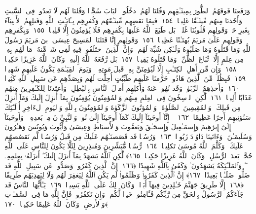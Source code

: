  وَرَفَعنَا فَوقَهُمُ ٱلطُّورَ بِمِيثَـٰقِهِم وَقُلنَا لَهُمُ ٱدخُلُوا۟ ٱلبَابَ سُجَّدًۭا وَقُلنَا لَهُم لَا تَعدُوا۟ فِى ٱلسَّبتِ وَأَخَذنَا مِنهُم مِّيثَـٰقًا غَلِيظًۭا ﴿١٥٤﴾
 فَبِمَا نَقضِهِم مِّيثَـٰقَهُم وَكُفرِهِم بِـَٔايَـٰتِ ٱللَّهِ وَقَتلِهِمُ ٱلأَنۢبِيَآءَ بِغَيرِ حَقٍّۢ وَقَولِهِم قُلُوبُنَا غُلفٌۢ ۚ بَل طَبَعَ ٱللَّهُ عَلَيهَا بِكُفرِهِم فَلَا يُؤمِنُونَ إِلَّا قَلِيلًۭا ﴿١٥٥﴾
 وَبِكُفرِهِم وَقَولِهِم عَلَىٰ مَريَمَ بُهتَـٰنًا عَظِيمًۭا ﴿١٥٦﴾
 وَقَولِهِم إِنَّا قَتَلنَا ٱلمَسِيحَ عِيسَى ٱبنَ مَريَمَ رَسُولَ ٱللَّهِ وَمَا قَتَلُوهُ وَمَا صَلَبُوهُ وَلَـٰكِن شُبِّهَ لَهُم ۚ وَإِنَّ ٱلَّذِينَ ٱختَلَفُوا۟ فِيهِ لَفِى شَكٍّۢ مِّنهُ ۚ مَا لَهُم بِهِۦ مِن عِلمٍ إِلَّا ٱتِّبَاعَ ٱلظَّنِّ ۚ وَمَا قَتَلُوهُ يَقِينًۢا ﴿١٥٧﴾
 بَل رَّفَعَهُ ٱللَّهُ إِلَيهِ ۚ وَكَانَ ٱللَّهُ عَزِيزًا حَكِيمًۭا ﴿١٥٨﴾
 وَإِن مِّن أَهلِ ٱلكِتَـٰبِ إِلَّا لَيُؤمِنَنَّ بِهِۦ قَبلَ مَوتِهِۦ ۖ وَيَومَ ٱلقِيَـٰمَةِ يَكُونُ عَلَيهِم شَهِيدًۭا ﴿١٥٩﴾
 فَبِظُلمٍۢ مِّنَ ٱلَّذِينَ هَادُوا۟ حَرَّمنَا عَلَيهِم طَيِّبَٰتٍ أُحِلَّت لَهُم وَبِصَدِّهِم عَن سَبِيلِ ٱللَّهِ كَثِيرًۭا ﴿١٦٠﴾
 وَأَخذِهِمُ ٱلرِّبَوٰا۟ وَقَد نُهُوا۟ عَنهُ وَأَكلِهِم أَموَٟلَ ٱلنَّاسِ بِٱلبَٰطِلِ ۚ وَأَعتَدنَا لِلكَـٰفِرِينَ مِنهُم عَذَابًا أَلِيمًۭا ﴿١٦١﴾
 لَّٰكِنِ ٱلرَّٟسِخُونَ فِى ٱلعِلمِ مِنهُم وَٱلمُؤمِنُونَ يُؤمِنُونَ بِمَآ أُنزِلَ إِلَيكَ وَمَآ أُنزِلَ مِن قَبلِكَ ۚ وَٱلمُقِيمِينَ ٱلصَّلَوٰةَ ۚ وَٱلمُؤتُونَ ٱلزَّكَوٰةَ وَٱلمُؤمِنُونَ بِٱللَّهِ وَٱليَومِ ٱلءَاخِرِ أُو۟لَـٰٓئِكَ سَنُؤتِيهِم أَجرًا عَظِيمًا ﴿١٦٢﴾
 ۞ إِنَّآ أَوحَينَآ إِلَيكَ كَمَآ أَوحَينَآ إِلَىٰ نُوحٍۢ وَٱلنَّبِيِّۦنَ مِنۢ بَعدِهِۦ ۚ وَأَوحَينَآ إِلَىٰٓ إِبرَٰهِيمَ وَإِسمَـٰعِيلَ وَإِسحَـٰقَ وَيَعقُوبَ وَٱلأَسبَاطِ وَعِيسَىٰ وَأَيُّوبَ وَيُونُسَ وَهَـٰرُونَ وَسُلَيمَـٰنَ ۚ وَءَاتَينَا دَاوُۥدَ زَبُورًۭا ﴿١٦٣﴾
 وَرُسُلًۭا قَد قَصَصنَـٰهُم عَلَيكَ مِن قَبلُ وَرُسُلًۭا لَّم نَقصُصهُم عَلَيكَ ۚ وَكَلَّمَ ٱللَّهُ مُوسَىٰ تَكلِيمًۭا ﴿١٦٤﴾
 رُّسُلًۭا مُّبَشِّرِينَ وَمُنذِرِينَ لِئَلَّا يَكُونَ لِلنَّاسِ عَلَى ٱللَّهِ حُجَّةٌۢ بَعدَ ٱلرُّسُلِ ۚ وَكَانَ ٱللَّهُ عَزِيزًا حَكِيمًۭا ﴿١٦٥﴾
 لَّٰكِنِ ٱللَّهُ يَشهَدُ بِمَآ أَنزَلَ إِلَيكَ ۖ أَنزَلَهُۥ بِعِلمِهِۦ ۖ وَٱلمَلَـٰٓئِكَةُ يَشهَدُونَ ۚ وَكَفَىٰ بِٱللَّهِ شَهِيدًا ﴿١٦٦﴾
 إِنَّ ٱلَّذِينَ كَفَرُوا۟ وَصَدُّوا۟ عَن سَبِيلِ ٱللَّهِ قَد ضَلُّوا۟ ضَلَـٰلًۢا بَعِيدًا ﴿١٦٧﴾
 إِنَّ ٱلَّذِينَ كَفَرُوا۟ وَظَلَمُوا۟ لَم يَكُنِ ٱللَّهُ لِيَغفِرَ لَهُم وَلَا لِيَهدِيَهُم طَرِيقًا ﴿١٦٨﴾
 إِلَّا طَرِيقَ جَهَنَّمَ خَـٰلِدِينَ فِيهَآ أَبَدًۭا ۚ وَكَانَ ذَٟلِكَ عَلَى ٱللَّهِ يَسِيرًۭا ﴿١٦٩﴾
 يَـٰٓأَيُّهَا ٱلنَّاسُ قَد جَآءَكُمُ ٱلرَّسُولُ بِٱلحَقِّ مِن رَّبِّكُم فَـَٔامِنُوا۟ خَيرًۭا لَّكُم ۚ وَإِن تَكفُرُوا۟ فَإِنَّ لِلَّهِ مَا فِى ٱلسَّمَـٰوَٟتِ وَٱلأَرضِ ۚ وَكَانَ ٱللَّهُ عَلِيمًا حَكِيمًۭا ﴿١٧٠﴾
